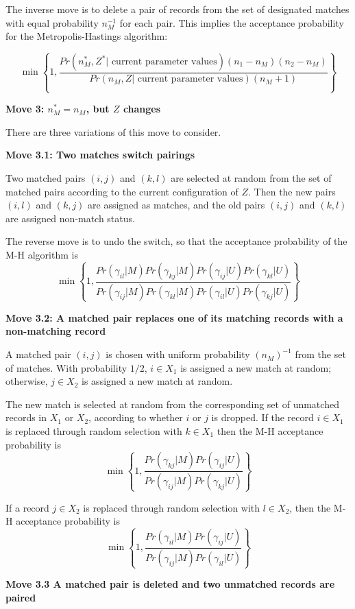 \documentclass[11pt,reqno]{amsart}
\begin{document}
The inverse move is to delete a pair of records from the set of designated matches with equal probability $n_M^{-1}$ for each pair.  This implies the acceptance probability for the Metropolis-Hastings algorithm:

\[ \min \left\{ 1, \frac{Pr\left(n_M^*, Z^* | \text{ current parameter values}\right)(n_1 - n_M)(n_2 - n_M)}{Pr\left(n_M, Z | \text{ current parameter values}\right)(n_M + 1)} \right\} \] 

\textbf{Move 3: $n_M^* = n_M$, but $Z$ changes} 

There are three variations of this move to consider. 

\textbf{Move 3.1: Two matches switch pairings}

Two matched pairs $(i,j)$ and $(k, l)$ are selected at random from the set of matched pairs according to the current configuration of $Z$.   Then the new pairs $(i,l)$ and $(k,j)$ are assigned as matches, and the old pairs $(i,j)$ and $(k,l)$ are assigned non-match status. 

The reverse move is to undo the switch, so that the acceptance probability of the M-H algorithm is
\[ \min \left\{ 1, \frac{Pr(\gamma_{il} | M) Pr(\gamma_{kj} | M) Pr(\gamma_{ij} | U) Pr(\gamma_{kl} | U)}{Pr(\gamma_{ij} | M) Pr(\gamma_{kl} | M) Pr(\gamma_{il} | U) Pr(\gamma_{kj} | U)} \right\} \] 

\textbf{Move 3.2: A matched pair replaces one of its matching records with a non-matching record}

A matched pair $(i,j)$ is chosen with uniform probability $(n_M)^{-1}$ from the set of matches.  With probability $1/2$, $i\in X_1$ is assigned a new match at random; otherwise, $j\in X_2$ is assigned a new match at random.

The new match is selected at random from the corresponding set of unmatched records in $X_1$ or $X_2$, according to whether $i$ or $j$ is dropped.   If the record $i \in X_1$ is replaced through random selection with $k \in X_1$ then the M-H acceptance probability is
\[ \min \left\{ 1, \frac{Pr(\gamma_{kj} | M) Pr(\gamma_{ij} | U)}{Pr(\gamma_{ij}| M) Pr(\gamma_{kj} | U)} \right\} \]

If a record $j\in X_2$ is replaced through random selection with $l \in X_2$, then the M-H acceptance probability is 
\[ \min \left\{1, \frac{Pr(\gamma_{il} | M) Pr(\gamma_{ij} | U)}{Pr(\gamma_{ij} | M) Pr(\gamma_{il} | U)} \right\} \]

\textbf{Move 3.3 A matched pair is deleted and two unmatched records are paired}
\end{document}
